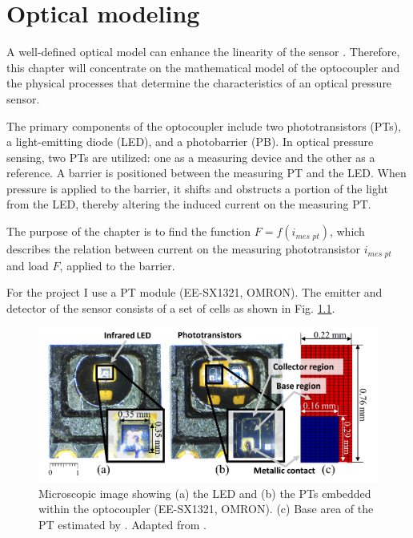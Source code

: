\chapter{Optical modeling}
\label{chapter:optical_modeling}
A well-defined optical model can enhance the linearity of the sensor \cite{my_love_pressure_photosensor}. Therefore, this chapter will concentrate on the mathematical model of the optocoupler and the physical processes that determine the characteristics of an optical pressure sensor.

The primary components of the optocoupler include two phototransistors (PTs), a light-emitting diode (LED), and a photobarrier (PB). 
In optical pressure sensing, two PTs are utilized: one as a measuring device and the other as a reference. 
A barrier is positioned between the measuring PT and the LED. 
When pressure is applied to the barrier, it shifts and obstructs a portion of the light from the LED, thereby altering the induced current on the measuring PT.

The purpose of the chapter is to find the function $F = f(i_{\textit{mes pt}})$, which describes the relation between current on the measuring phototransistor $i_{\textit{mes pt}}$ and load $F$, applied to the barrier.

For the project I use a PT module (EE-SX1321, OMRON). 
The emitter and detector of the sensor consists of a set of cells as shown in Fig. \ref{fig:microscopic_image}.

\begin{figure}[H]
  \includegraphics[width=\textwidth]{figs/Microscopic_image.png}
    \centering
    \caption{ Microscopic image showing (a) the LED and (b) the PTs embedded within the optocoupler (EE-SX1321, OMRON). 
    (c) Base area of the PT estimated by \cite[Fig. 4]{my_love_pressure_photosensor}.
    Adapted from \cite[Fig. 4]{my_love_pressure_photosensor}.}
    \label{fig:microscopic_image}
\end{figure}

